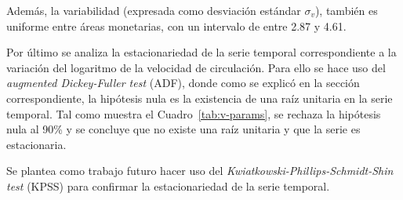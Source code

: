 \documentclass[titlepage, 12pt]{article}
\begin{document}
Además, la variabilidad (expresada como desviación estándar $\sigma_v$), también es uniforme entre áreas monetarias, con un intervalo de entre 2.87 y 4.61.

Por último se analiza la estacionariedad de la serie temporal correspondiente a la variación del logaritmo de la velocidad de circulación. Para ello se hace uso del \textit{augmented Dickey-Fuller test} (ADF), donde como se explicó en la sección correspondiente, la hipótesis nula es la existencia de una raíz unitaria en la serie temporal. Tal como muestra el Cuadro~\ref{tab:v-params}, se rechaza la hipótesis nula al 90\% y se concluye que no existe una raíz unitaria y que la serie es estacionaria.

Se plantea como trabajo futuro hacer uso del \textit{Kwiatkowski-Phillips-Schmidt-Shin test} (KPSS) para confirmar la estacionariedad de la serie temporal.
\end{document}
